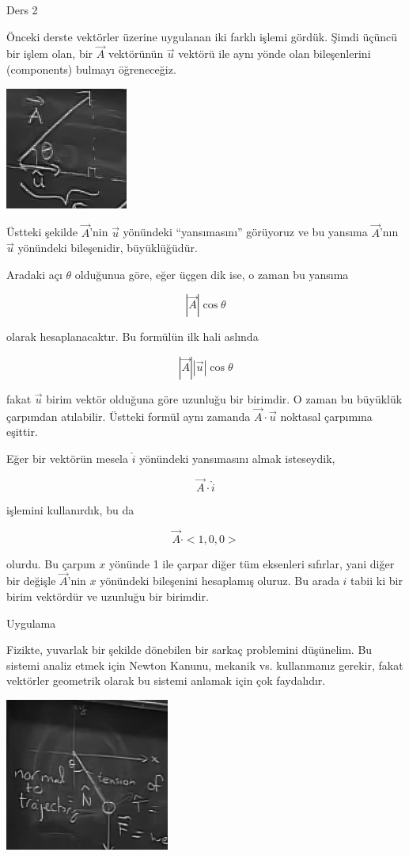 \documentclass[12pt,fleqn]{article}\usepackage{../../common}
\begin{document}
Ders 2


Önceki derste vektörler üzerine uygulanan iki farklı işlemi gördük. Şimdi üçüncü
bir işlem olan, bir $\vec{A}$ vektörünün $\vec{u}$ vektörü ile aynı yönde olan
bileşenlerini (components) bulmayı öğreneceğiz.

\includegraphics[height=4cm]{2_1.png}

Üstteki şekilde $\vec{A}$'nin $\vec{u}$ yönündeki ``yansımasını'' görüyoruz ve
bu yansıma $\vec{A}$'nın $\vec{u}$ yönündeki bileşenidir, büyüklüğüdür.

Aradaki açı $\theta$ olduğunua göre, eğer üçgen dik ise, o zaman bu yansıma 

$$ |\vec{A}| \cos \theta $$

olarak hesaplanacaktır. Bu formülün ilk hali aslında

$$ |\vec{A}| |\vec{u}| \cos \theta $$

fakat $\vec{u}$ birim vektör olduğuna göre uzunluğu bir birimdir. O zaman bu
büyüklük çarpımdan atılabilir.  Üstteki formül aynı zamanda
$\vec{A}\cdot\vec{u}$ noktasal çarpımına eşittir.

Eğer bir vektörün mesela $\hat{i}$ yönündeki yansımasını almak isteseydik,

$$ \vec{A} \cdot \hat{i} $$

işlemini kullanırdık, bu da

$$ \vec{A} \cdot <1,0,0>$$

olurdu. Bu çarpım $x$ yönünde 1 ile çarpar diğer tüm eksenleri sıfırlar, yani
diğer bir değişle $\vec{A}$'nin $x$ yönündeki bileşenini hesaplamış oluruz. Bu
arada $\hat{i}$ tabii ki bir birim vektördür ve uzunluğu bir birimdir.


Uygulama

Fizikte, yuvarlak bir şekilde dönebilen bir sarkaç problemini düşünelim. Bu
sistemi analiz etmek için Newton Kanunu, mekanik vs. kullanmanız gerekir, fakat 
vektörler geometrik olarak bu sistemi anlamak için çok faydalıdır.

\includegraphics[height=5cm]{2_2.png}
\end{document}
